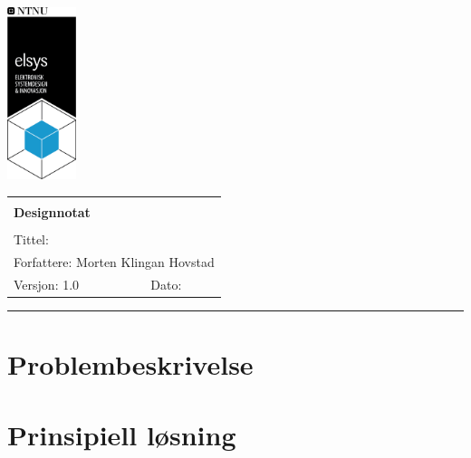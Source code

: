\documentclass[a4paper,11pt,norsk]{article}
\begin{document}
\begin{minipage}[c]{0.15\textwidth}
\includegraphics[width=2.0cm]{maler_og_skript/grafikk/elsys_pos_staaende_ntnu.png}  
\end{minipage}
\begin{minipage}[c]{0.85\textwidth}

\renewcommand{\arraystretch}{1.7}
\large 
\begin{tabularx}{\textwidth}{|X|X|}
\hline
\multicolumn{2}{|l|}{} \\
\multicolumn{2}{|l|}{\huge \textbf{Designnotat}} \\
\multicolumn{2}{|l|}{}  \\
\hline
\multicolumn{2}{|l|}{Tittel: 

} \\
\hline
\multicolumn{2}{|l|}{Forfattere: 
Morten Klingan Hovstad
} \\
\hline
Versjon: 1.0 & Dato: 
\\
\hline 
\end{tabularx}
\end{minipage}
\normalsize


\setlength{\parskip}{0ex}
\renewcommand{\baselinestretch}{0.1}\normalsize
\tableofcontents
\renewcommand{\baselinestretch}{1.00}\normalsize
\setlength{\parskip}{2ex}
\rule{\textwidth}{1pt}

\section{Problembeskrivelse}
\label{sec:innledning}

\section{Prinsipiell løsning}
\label{sec:prinsipielllosning}
\end{document}
